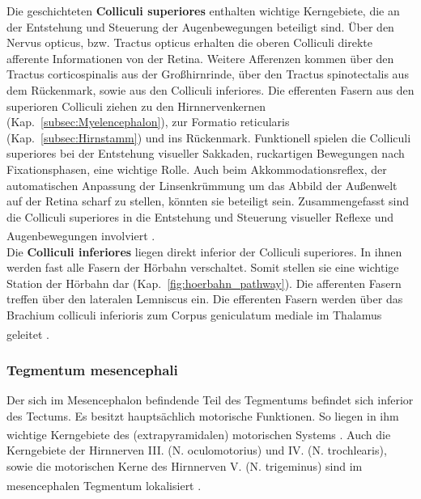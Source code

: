\documentclass[12pt,a4paper,pdftex]{article}
\begin{document}
\noindent Die geschichteten \textbf{Colliculi superiores} enthalten wichtige Kerngebiete, die an der Entstehung und Steuerung der Augenbewegungen beteiligt sind. Über den Nervus opticus, bzw. Tractus opticus erhalten die oberen Colliculi direkte afferente Informationen von der Retina. Weitere Afferenzen kommen über den Tractus corticospinalis aus der Großhirnrinde, über den Tractus spinotectalis aus dem Rückenmark, sowie aus den Colliculi inferiores. Die efferenten Fasern aus den superioren Colliculi ziehen zu den Hirnnervenkernen (Kap.~\ref{subsec:Myelencephalon}), zur Formatio reticularis (Kap.~\ref{subsec:Hirnstamm}) und ins Rückenmark. Funktionell spielen die Colliculi superiores bei der Entstehung visueller Sakkaden, ruckartigen Bewegungen nach Fixationsphasen, eine wichtige Rolle. Auch beim  Akkommodationsreflex, der automatischen Anpassung der Linsenkrümmung um das Abbild der Außenwelt auf der Retina scharf zu stellen, könnten sie beteiligt sein. Zusammengefasst sind die Colliculi superiores in die Entstehung und Steuerung visueller Reflexe und Augenbewegungen involviert \textsuperscript{\cite[6]{trepel2011neuroanatomie}}.\\

\noindent Die \textbf{Colliculi inferiores} liegen direkt inferior der Colliculi superiores. In ihnen werden fast alle Fasern der Hörbahn verschaltet. Somit stellen sie eine wichtige Station der Hörbahn dar (Kap.~\ref{fig:hoerbahn_pathway}). Die afferenten Fasern treffen über den lateralen Lemniscus ein. Die efferenten Fasern werden über das Brachium colliculi inferioris zum Corpus geniculatum mediale im Thalamus geleitet \textsuperscript{\cite[6]{trepel2011neuroanatomie}}.


\subsubsection{Tegmentum mesencephali}

Der sich im Mesencephalon befindende Teil des Tegmentums befindet sich inferior des Tectums. Es besitzt hauptsächlich motorische Funktionen. So liegen in ihm wichtige Kerngebiete des (extrapyramidalen) motorischen Systems \textsuperscript{\cite[14]{penzlin2005tierphys}}.
Auch die Kerngebiete der Hirnnerven III. (N. oculomotorius) und IV. (N. trochlearis), sowie die motorischen Kerne des Hirnnerven V. (N. trigeminus) sind im mesencephalen Tegmentum lokalisiert \textsuperscript{\cite[6]{trepel2011neuroanatomie}}.\\
\end{document}

